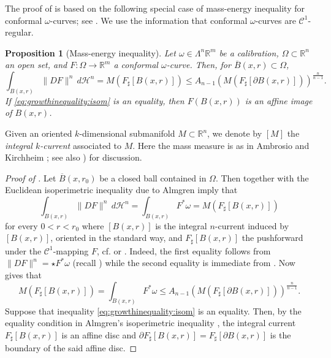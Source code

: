 \documentclass[a4paper,leqno,11pt]{amsart}
\numberwithin{equation}{section}
\newtheorem{proposition}[theorem]{Proposition}
\theoremstyle{remark}
\theoremstyle{remark}
\newcommand{\R}{\mathbb{R}}
\begin{document}
The proof of 
is based on the following special case of mass-energy inequality for conformal $\omega$-curves; see \cite{Iko:23}. We use the information that conformal $\omega$-curves are $\mathcal{C}^1$-regular. 
\begin{proposition}[Mass-energy inequality]
\label{prop:massenergy}
Let $\omega \in \Lambda^n \R^m$ be a calibration, $\Omega\subset \R^n$ an open set, and $F \colon \Omega \to \R^m$ a conformal $\omega$-curve. Then, for $\overline{B}(x,r) \subset \Omega$, 
\begin{equation}
\label{eq:growthinequality:isom}
\int_{ B(x,r) } \|DF\|^n \,d\mathcal{H}^n = M( F_{\sharp}[ B(x,r) ] ) 
\leq A_{n-1} \left( M( F_\sharp[ \partial B(x,r) ] ) \right)^{ \frac{n}{n-1} }.
\end{equation}
If \eqref{eq:growthinequality:isom} is an equality, then $F( B(x,r) )$ is an affine image of $B(x,r)$.
\end{proposition}
Given an oriented $k$-dimensional submanifold $M \subset \mathbb{R}^n$, we denote by $[ M ]$ the \emph{integral $k$-current} associated to $M$. Here the mass measure is as in Ambrosio and Kirchheim \cite[Definition 2.6]{AK:00:current}; see also \cite[Section 2.7]{Iko:23}) for discussion.
\begin{proof}[Proof of ]
Let $\overline{B}(x,r_0)$ be a closed ball contained in $\Omega$.
Then \cite[Lemma 6.1 and Proposition 6.7]{Iko:23} together with the Euclidean isoperimetric inequality due to Almgren \cite[Theorem 10]{Alm:86} imply that
\begin{equation*}
    \int_{B(x,r)} \|DF\|^n \,d\mathcal{H}^n
    =
    \int_{ B(x,r) } F^{*}\omega
    =
    M( F_{\sharp}[ B(x,r) ] )
\end{equation*}
for every $0 < r < r_0$ where $[ B(x,r) ]$ is the integral $n$-current induced by $[ B(x,r) ]$, oriented in the standard way, and $F_{\sharp}[ B(x,r) ]$ the pushforward under the $\mathcal{C}^{1}$-mapping $F$, cf. \cite[Definition 2.4]{AK:00:current} or \cite[4.1.7]{Fed:69}. Indeed, the first equality follows from $\|DF\|^n = \star F^{*}\omega$ (recall ) while the second equality is immediate from \cite[Proposition 6.7]{Iko:23}. Now \cite[Lemma 6.1]{Iko:23} gives that
\begin{equation*}
    M( F_{\sharp}[ B(x,r) ] )
    =
    \int_{ B(x,r) } F^{*}\omega
    \leq
    A_{n-1}
    \left(
        M( F_\sharp[ \partial B(x,r) ] )
    \right)^{ \frac{n}{n-1} }.
\end{equation*}
Suppose that inequality \eqref{eq:growthinequality:isom} is an equality. Then, by the equality condition in Almgren's isoperimetric inequality \cite[Theorem 10]{Alm:86}, the integral current $F_\sharp[ B(x,r) ]$ is an affine disc and $\partial F_\sharp[ B(x,r) ] = F_\sharp[ \partial B(x,r) ]$ is the boundary of the said affine disc.
\end{proof}
\end{document}
